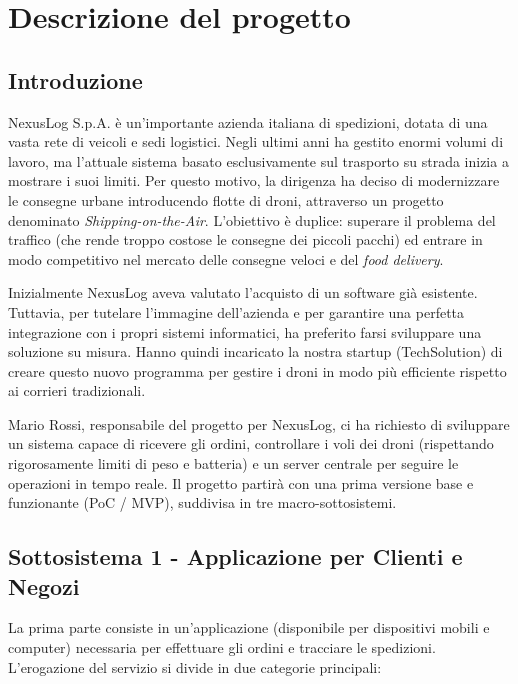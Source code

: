 \documentclass[11pt, a4paper]{article}
\begin{document}
\section{Descrizione del progetto}

\subsection{Introduzione}
NexusLog S.p.A. è un'importante azienda italiana di spedizioni, dotata di una vasta rete di veicoli e sedi logistici. Negli ultimi anni ha gestito enormi volumi di lavoro, ma l'attuale sistema basato esclusivamente sul trasporto su strada inizia a mostrare i suoi limiti. Per questo motivo, la dirigenza ha deciso di modernizzare le consegne urbane introducendo flotte di droni, attraverso un progetto denominato \textit{Shipping-on-the-Air}. L'obiettivo è duplice: superare il problema del traffico (che rende troppo costose le consegne dei piccoli pacchi) ed entrare in modo competitivo nel mercato delle consegne veloci e del \textit{food delivery}. 

Inizialmente NexusLog aveva valutato l'acquisto di un software già esistente. Tuttavia, per tutelare l'immagine dell'azienda e per garantire una perfetta integrazione con i propri sistemi informatici, ha preferito farsi sviluppare una soluzione su misura. Hanno quindi incaricato la nostra startup (TechSolution) di creare questo nuovo programma per gestire i droni in modo più efficiente rispetto ai corrieri tradizionali.

Mario Rossi, responsabile del progetto per NexusLog, ci ha richiesto di sviluppare un sistema capace di ricevere gli ordini, controllare i voli dei droni (rispettando rigorosamente limiti di peso e batteria) e un server centrale per seguire le operazioni in tempo reale. Il progetto partirà con una prima versione base e funzionante (PoC / MVP), suddivisa in tre macro-sottosistemi.

\subsection{Sottosistema 1 - Applicazione per Clienti e Negozi}
La prima parte consiste in un'applicazione (disponibile per dispositivi mobili e computer) necessaria per effettuare gli ordini e tracciare le spedizioni. L'erogazione del servizio si divide in due categorie principali:
\end{document}
